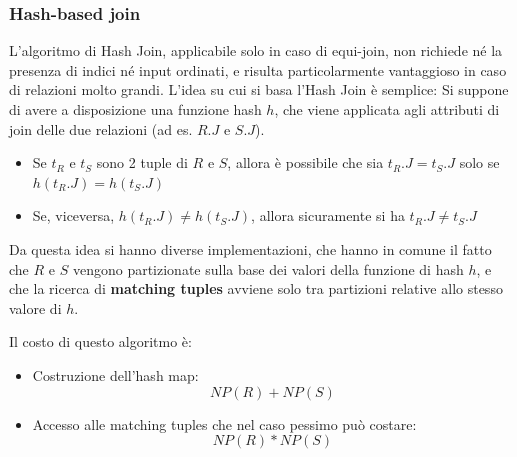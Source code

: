 \documentclass[a4paper,twoside]{article}
\begin{document}
\subsubsection*{Hash-based join}
L'algoritmo di Hash Join, applicabile solo in caso di equi-join, non richiede né la
presenza di indici né input ordinati, e risulta particolarmente vantaggioso in caso
di relazioni molto grandi. L'idea su cui si basa l'Hash Join è semplice:
Si suppone di avere a disposizione una funzione hash \( h \), che viene applicata agli
attributi di join delle due relazioni (ad es. \( R.J \) e \( S.J \)).
\begin{itemize}
  \item Se \( t_R \) e \( t_S \) sono 2 tuple di \( R \) e \( S \), allora è possibile
    che sia \( t_R.J = t_S.J \) solo se \( h(t_R.J) = h(t_S.J) \)

  \item Se, viceversa, \( h(t_R.J) \neq h(t_S.J) \), allora sicuramente si ha
    \( t_R.J \neq t_S.J \)
\end{itemize}
Da questa idea si hanno diverse implementazioni, che hanno in comune il fatto
che \( R \) e \( S \) vengono partizionate sulla base dei valori della funzione di
hash \( h \), e che la ricerca di \textbf{matching tuples} avviene solo tra
partizioni relative allo stesso valore di \( h \).

\vspace{1em}
\noindent
Il costo di questo algoritmo è:
\begin{itemize}
  \item Costruzione dell'hash map:
    \[
      NP(R) + NP(S)
    \] 

  \item Accesso alle matching tuples che nel caso pessimo può costare:
    \[
      NP(R) * NP(S)
    \] 
\end{itemize}
\end{document}
